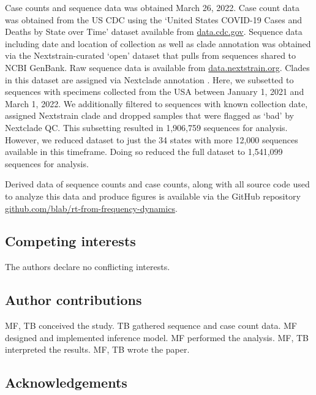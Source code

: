 \documentclass[11pt,oneside,letterpaper]{article}
\begin{document}
Case counts and sequence data was obtained March 26, 2022.
Case count data was obtained from the US CDC using the `United States COVID-19 Cases and Deaths by State over Time' dataset available from \href{https://data.cdc.gov/Case-Surveillance/United-States-COVID-19-Cases-and-Deaths-by-State-o/9mfq-cb36}{data.cdc.gov}.
Sequence data including date and location of collection as well as clade annotation was obtained via the Nextstrain-curated `open' dataset \cite{Hadfield2018} that pulls from sequences shared to NCBI GenBank.
Raw sequence data is available from \href{https://docs.nextstrain.org/projects/ncov/en/latest/reference/remote_inputs.html}{data.nextstrain.org}.
Clades in this dataset are assigned via Nextclade annotation \cite{aksamentov2021nextclade}.
Here, we subsetted to sequences with specimens collected from the USA between January 1, 2021 and March 1, 2022.
We additionally filtered to sequences with known collection date, assigned Nextstrain clade and dropped samples that were flagged as `bad' by Nextclade QC.
This subsetting resulted in 1,906,759 sequences for analysis.
However, we reduced dataset to just the 34 states with more 12,000 sequences available in this timeframe.
Doing so reduced the full dataset to 1,541,099 sequences for analysis.

Derived data of sequence counts and case counts, along with all source code used to analyze this data and produce figures is available via the GitHub repository \href{https://github.com/blab/rt-from-frequency-dynamics/}{github.com/blab/rt-from-frequency-dynamics}.

\subsection*{Competing interests}%

The authors declare no conflicting interests.

\subsection*{Author contributions}

MF, TB conceived the study.
TB gathered sequence and case count data.
MF designed and implemented inference model.
MF performed the analysis.
MF, TB interpreted the results.
MF, TB wrote the paper.

\subsection*{Acknowledgements}%
\end{document}
